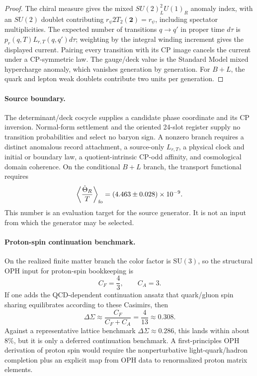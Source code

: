 \begin{proof}
The chiral measure gives the mixed \(SU(2)_L^2U(1)_R\) anomaly index, with an
\(SU(2)\) doublet contributing \(r_\psi2T_2(\mathbf2)=r_\psi\), including
spectator multiplicities. The expected number of transitions \(q\to q'\) in
proper time \(d\tau\) is \(p_r(q,T)L_{r,T}(q,q')d\tau\); weighting by the
integral winding increment gives the displayed current. Pairing every
transition with its CP image cancels the current under a CP-symmetric law.
The gauge/deck value is the Standard Model mixed hypercharge anomaly, which
vanishes generation by generation. For \(B+L\), the quark and lepton weak
doublets contribute two units per generation.
\end{proof}

\paragraph{Source boundary.}
The determinant/deck cocycle supplies a candidate phase coordinate and its CP
inversion. Normal-form settlement and the oriented 24-slot register supply no
transition probabilities and select no baryon sign. A nonzero branch requires
a distinct anomalous record attachment, a source-only \(L_{r,T}\), a physical
clock and initial or boundary law, a quotient-intrinsic CP-odd affinity, and
cosmological domain coherence. On the conditional \(B+L\) branch, the
transport functional requires
\[
\left\langle\frac{\dot\Theta_R}{T}\right\rangle_{\rm fo}
=(4.463\pm0.028)\times10^{-9}.
\]
This number is an evaluation target for the source generator. It is not an
input from which the generator may be selected.

\paragraph{Proton-spin continuation benchmark.}
On the realized finite matter branch the color factor is \(\mathrm{SU}(3)\), so the structural OPH
input for proton-spin bookkeeping is
\[
C_F=\frac43,
\qquad
C_A=3.
\]
If one adds the QCD-dependent continuation ansatz that quark/gluon spin sharing equilibrates
according to these Casimirs, then
\[
\Delta\Sigma\approx \frac{C_F}{C_F+C_A}=\frac{4}{13}\approx 0.308.
\]
Against a representative lattice benchmark \(\Delta\Sigma\approx 0.286\), this lands within about
\(8\%\), but it is only a deferred continuation benchmark. A first-principles OPH derivation of
proton spin would require the nonperturbative light-quark/hadron completion plus an explicit map
from OPH data to renormalized proton matrix elements.

